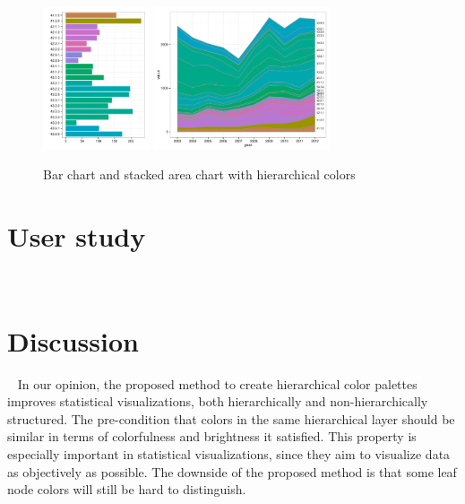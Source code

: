 \documentclass[journal]{vgtc}                %
\begin{document}
\begin{figure}[htb]
  \centering
  \includegraphics[width=1.235in]{bar_chart.pdf}
  \includegraphics[width=2.065in]{stackedarea_chart.pdf}
  \caption{Bar chart and stacked area chart with hierarchical colors}\label{fig:charts}
\end{figure}





\section{User study}~\label{secuser}


\section{Discussion}~\label{secdisc}
In our opinion, the proposed method to create hierarchical color palettes improves statistical visualizations, both hierarchically and non-hierarchically structured. The pre-condition that colors in the same hierarchical layer should be similar in terms of colorfulness and brightness it satisfied. This property is especially important in statistical visualizations, since they aim to visualize data as objectively as possible. The downside of the proposed method is that some leaf node colors will still be hard to distinguish.
\end{document}
